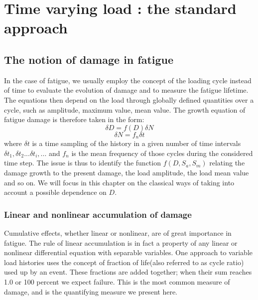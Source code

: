 \chapter{Time varying load : the standard approach}\label{chp:4}
\minitoc

\section{The notion of damage in fatigue}


In the case of fatigue, we usually employ the concept of the loading cycle instead of time to evaluate the evolution of damage and to measure the fatigue lifetime. The equations then depend on the load through globally defined quantities over a cycle, such as amplitude, maximum value, mean value.
The growth equation of fatigue damage is therefore taken in the form:
$$\delta D=f(D)\delta N$$
$$\delta N=f_n\delta t$$
where $\delta t$ is a time sampling of the history in a given number of time intervals $\delta t_1,\delta t_2 ... \delta t_i, ...$ and $f_n$ is the mean frequency of those cycles during the considered time step. The issue is thus to identify the function $f(D,S_a,S_m)$ relating the damage growth to the present damage, the load amplitude, the load mean value and so on. We will focus in this chapter on the classical ways of taking into account a possible dependence on $D$.

\subsection{Linear and nonlinear accumulation of damage}
Cumulative effects, whether linear or nonlinear, are of great importance in fatigue. The rule of linear accumulation is in fact a property of any linear or nonlinear differential equation with separable variables. One approach to variable load histories uses the concept of fraction of life(also referred to as cycle ratio) used up by an event. These fractions are added together; when their sum reaches 1.0 or 100 percent we expect failure. This is the most common measure of damage, and is the quantifying measure we present here. 

